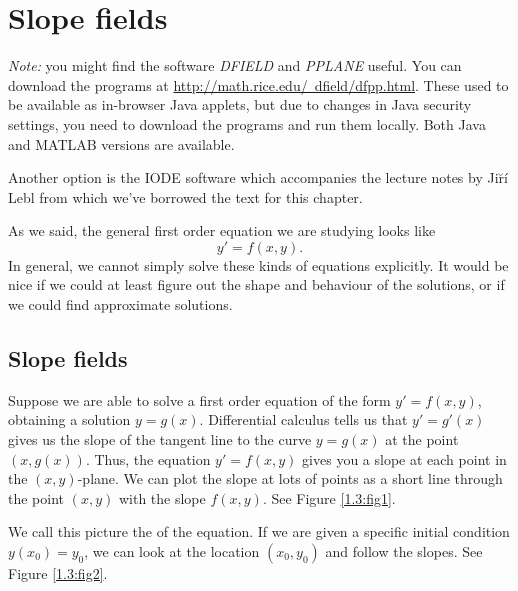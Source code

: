 \section{Slope fields}\label{sec:slopefields}

{\em Note:} you might find the software {\em DFIELD} and {\em PPLANE} useful. You can download the programs at \href{http://math.rice.edu/~dfield/dfpp.html}{http://math.rice.edu/\string~dfield/dfpp.html}. These used to be available as in-browser Java applets, but due to changes in Java security settings, you need to download the programs and run them locally. Both Java and MATLAB versions are available.

Another option is the IODE software which accompanies the lecture notes by Ji\u{r}\'{i} Lebl from which we've borrowed the text for this chapter.

\medskip

As we said, the general first order equation we are studying looks like
\begin{equation*}
y' = f(x,y).
\end{equation*}
In general, we cannot simply solve these kinds of equations explicitly.
It would be nice if we could at least figure out the shape and behaviour of
the solutions, or if we could find approximate solutions.

\subsection*{Slope fields}

Suppose we are able to solve a first order equation of the form $y'=f(x,y)$, obtaining a solution $y=g(x)$. Differential calculus tells us that $y'=g'(x)$ gives us the slope of the tangent line to the curve $y=g(x)$ at the point $(x,g(x))$.  Thus, the equation $y' = f(x,y)$
gives you a slope at each point 
in the
$(x,y)$-plane.  We can plot the slope at lots of points
as a short line through the point $(x,y)$ with the slope $f(x,y)$.
See Figure \ref{1.3:fig1}.



We call this picture the  of the equation.
If we are given a specific initial
condition $y(x_0) = y_0$, we can look at the
location $(x_0,y_0)$ and follow the slopes.  See Figure \ref{1.3:fig2}.

